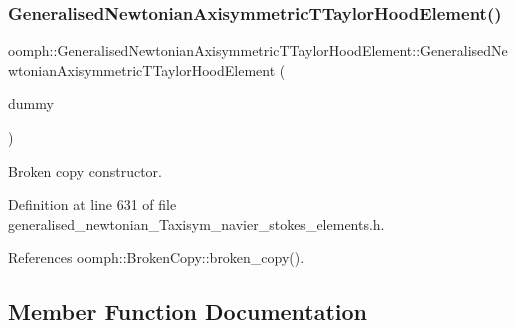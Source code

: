 \subsubsection{\texorpdfstring{Generalised\+Newtonian\+Axisymmetric\+T\+Taylor\+Hood\+Element()}{GeneralisedNewtonianAxisymmetricTTaylorHoodElement()}\hspace{0.1cm}{\footnotesize\ttfamily [2/2]}}
{\footnotesize\ttfamily oomph\+::\+Generalised\+Newtonian\+Axisymmetric\+T\+Taylor\+Hood\+Element\+::\+Generalised\+Newtonian\+Axisymmetric\+T\+Taylor\+Hood\+Element (\begin{DoxyParamCaption}\item[{const \hyperlink{classoomph_1_1GeneralisedNewtonianAxisymmetricTTaylorHoodElement}{Generalised\+Newtonian\+Axisymmetric\+T\+Taylor\+Hood\+Element} \&}]{dummy }\end{DoxyParamCaption})\hspace{0.3cm}{\ttfamily [inline]}}



Broken copy constructor. 



Definition at line 631 of file generalised\+\_\+newtonian\+\_\+\+Taxisym\+\_\+navier\+\_\+stokes\+\_\+elements.\+h.



References oomph\+::\+Broken\+Copy\+::broken\+\_\+copy().



\subsection{Member Function Documentation}
\mbox{\label{classoomph_1_1GeneralisedNewtonianAxisymmetricTTaylorHoodElement_ad34b985b934382ef26968ebea4f54522}} 
